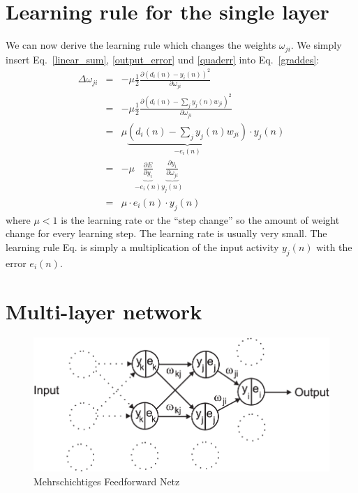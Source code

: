 \documentclass[12pt]{article}
\begin{document}
\section{Learning rule for the single layer}
We can now derive the learning rule which changes the weights $\omega_{ji}$.
We simply insert Eq.~\ref{linear_sum}, \ref{output_error} und \ref{quaderr} into Eq.~\ref{graddes}:
\begin{eqnarray}
  \Delta\omega_{ji}
   & = & - \mu \frac{1}{2} \frac{\partial ( d_i(n) - y_i(n) )^2 }{\partial \omega_{ji}} \\
   & = & - \mu \frac{1}{2} \frac{\partial \left( d_i(n) - \sum_j y_j(n) w_{ji} \right)^2 }{\partial \omega_{ji}} \\
  & = & \mu \underbrace{\left(d_i(n) - \sum_j y_j(n) w_{ji}\right)}_{-e_i(n)} \cdot y_j(n) \\
   & = & - \mu \underbrace{\frac{\partial E}{\partial y_i}}_{-e_i(n)} \underbrace{\frac{\partial y_i}{\partial \omega_{ji}}}_{y_j(n)} \label{chainrule}\\
  & = & \mu \cdot e_i(n) \cdot y_j(n) \label{learningrule}
\end{eqnarray}
where $\mu < 1$ is the learning rate or the ``step change'' so the
amount of weight change for every learning step. The learning rate is
usually very small. The learning rule Eq.\label{learningrule} is
simply a multiplication of the input activity $y_j(n)$ with the error
$e_i(n)$.


\section{Multi-layer network}
\begin{figure}[!hbt]
\begin{center}
\mbox{\includegraphics[width=\textwidth]{multi_layer}}
\end{center}
\caption{Mehrschichtiges Feedforward Netz
\label{multi_layer}}
\end{figure}
\end{document}

